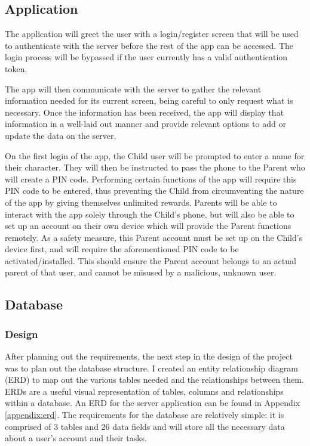 \subsection{Application}
The application will greet the user with a login/register screen that will be used to authenticate with the server before the rest of the app can be accessed.
The login process will be bypassed if the user currently has a valid authentication token.

The app will then communicate with the server to gather the relevant information needed for its current screen, being careful to only request what is necessary.
Once the information has been received, the app will display that information in a well-laid out manner and provide relevant options to add or update the data on the server.

On the first login of the app, the Child user will be prompted to enter a name for their character. 
They will then be instructed to pass the phone to the Parent who will create a PIN code.
Performing certain functions of the app will require this PIN code to be entered, thus preventing the Child from circumventing the nature of the app by giving themselves unlimited rewards.
Parents will be able to interact with the app solely through the Child's phone, but will also be able to set up an account on their own device which will provide the Parent functions remotely.
As a safety measure, this Parent account must be set up on the Child's device first, and will require the aforementioned PIN code to be activated/installed. 
This should ensure the Parent account belongs to an actual parent of that user, and cannot be misused by a malicious, unknown user. 

\subsection{Database}
\subsubsection{Design}
After planning out the requirements, the next step in the design of the project was to plan out the database structure.
I created an entity relationship diagram (ERD) to map out the various tables needed and the relationships between them.
ERDs are a useful visual representation of tables, columns and relationships within a database.
An ERD for the server application can be found in Appendix \ref{appendix:erd}.
The requirements for the database are relatively simple: it is comprised of 3 tables and 26 data fields and will store all the necessary data about a user's account and their tasks.

